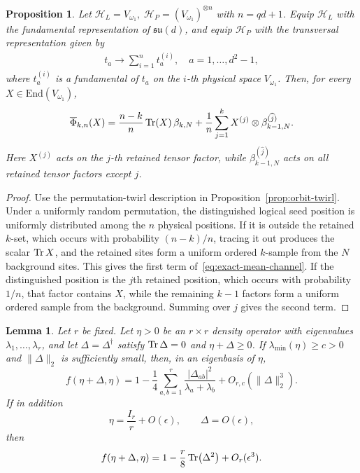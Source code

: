 \documentclass[11pt,letterpaper]{article}
\theoremstyle{plain}
\theoremstyle{plain}
\theoremstyle{plain}
\theoremstyle{plain}
\theoremstyle{plain}
\theoremstyle{plain}
\newcommand{\End}{\mathrm{End}}
\theoremstyle{plain}
\newtheorem{smproposition}[smtheorem]{Proposition}
\newtheorem{smlemma}[smtheorem]{Lemma}
\theoremstyle{definition}
\theoremstyle{plain}
\begin{document}
\begin{smproposition}
\label{prop:exact-mean-channel}
Let
    $
        \mathcal H_L=V_{\omega_1},\;
        \mathcal H_P=(V_{\omega_1})^{\otimes n}
    $
    with $n=qd+1$.
    Equip \(\mathcal H_L\) with the fundamental representation of
    \(\mathfrak{su}(d)\), and equip \(\mathcal H_P\) with the transversal
    representation given by
    \begin{equation}
    \begin{gathered}
    t_a \rightarrow \sum_{i=1}^n t_a^{(i)}, \quad a=1,\ldots,d^2-1,
    \end{gathered}
    \end{equation}
    where $t_a^{(i)}$ is a fundamental of $t_a$ on the $i$-th physical space $V_{\omega_1}$. Then, for every $X\in\End(V_{\omega_1})$,
\begin{equation}
\label{eq:exact-mean-channel}
    \overline{\Phi}_{k,n}(X)
    =
    \frac{n-k}{n}\Tr(X)\,\beta_{k,N}
    +
    \frac{1}{n}\sum_{j=1}^k
    X^{(j)}\otimes
    \beta_{k-1,N}^{(\widehat j)}
    .
\end{equation}
Here $X^{(j)}$ acts on the $j$-th retained tensor factor, while
$\beta_{k-1,N}^{(\widehat j)}$ acts on all retained tensor factors
except $j$.
\end{smproposition}

\begin{proof}
Use the permutation-twirl description in Proposition~\ref{prop:orbit-twirl}. Under a uniformly random permutation, the distinguished logical seed position is uniformly 
distributed among the $n$ physical positions.
If it is outside the retained $k$-set, which occurs with probability $(n-k)/n$, tracing it out produces the scalar $\Tr X$, 
and the retained sites form a uniform ordered $k$-sample from the $N$ background sites. This gives the first term of~\eqref{eq:exact-mean-channel}.
If the distinguished position is the $j$th retained position, which occurs with probability $1/n$, that factor contains $X$, while the remaining $k-1$ factors form a uniform ordered sample from the background. 
Summing over $j$ gives the second term.  
\end{proof}

\begin{smlemma}
\label{lem:bures-expansion}
Let $r$ be fixed.  Let $\eta>0$ be an $r\times r$ density operator with eigenvalues $\lambda_1,\ldots,\lambda_r$, and let $\Delta=\Delta^\dagger$ satisfy $\Tr\Delta=0$ and $\eta+\Delta\ge0$. 
If $\lambda_{\min}(\eta)\ge c>0$ and $\|\Delta\|_2$ is sufficiently small, then, in an eigenbasis of $\eta$,
\begin{equation}
\label{eq:general-bures-expansion}
  f(\eta+\Delta,\eta)
  =1-\frac14\sum_{a,b=1}^r
      \frac{|\Delta_{ab}|^2}{\lambda_a+\lambda_b}
      +O_{r,c}(\|\Delta\|_2^3).
\end{equation}
If in addition
\[
  \eta=\frac{I_r}{r}+O(\epsilon),
  \qquad
  \Delta=O(\epsilon),
\]
then
\begin{equation}
\label{eq:mixed-bures-expansion}
  f(\eta+\Delta,\eta)
  =1-\frac r8\Tr(\Delta^2)+O_r(\epsilon^3).
\end{equation}
\end{smlemma}
\end{document}
